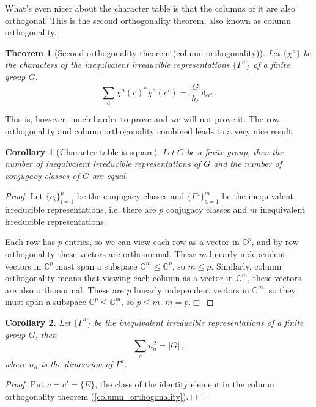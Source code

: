 \documentclass{article}
\theoremstyle{plain}\theoremheaderfont{\normalfont\itshape}\theorembodyfont{\rmfamily}\theoremseparator{.}\newtheorem*{rem}{Remark}\newtheorem*{ex}{Example}\newtheorem*{proof}{Proof}\newtheorem*{altp}{Alternative proof}
\theoremstyle{plain}\theoremheaderfont{\normalfont\bfseries}\theorembodyfont{\rmfamily}\theoremseparator{.}\newtheorem{thm}{Theorem}[section]\newtheorem{lem}[thm]{Lemma}\newtheorem{prop}[thm]{Proposition}\newtheorem*{cor}{Corollary}\newtheorem{defn}[thm]{Definition}\newtheorem{clm}[thm]{Claim}\newtheorem{clminproof}{Claim}\newtheorem*{law}{Law}\newtheorem{pos}[thm]{Postulate}
\theoremstyle{break}\theoremheaderfont{\normalfont\itshape}\theorembodyfont{\rmfamily}\theoremseparator{.\medskip}\newtheorem*{proofskip}{Proof}\newtheorem*{exs}{Examples}\newtheorem*{rems}{Remarks}
\theoremstyle{break}\theoremheaderfont{\normalfont\bfseries}\theorembodyfont{\rmfamily}\theoremseparator{.\medskip}\newtheorem{lemskip}[thm]{Lemma}\newtheorem{defnskip}[thm]{Definition}\newtheorem{propskip}[thm]{Proposition}\newtheorem{thmskip}[thm]{Theorem}
\numberwithin{equation}{section}
\newcommand{\qed}{\hfill\ensuremath{\Box}}
\newcommand{\abs}[1]{\left| #1 \right|}
\newcommand{\CC}{\mathbb{C}}
\begin{document}
    What's even nicer about the character table is that the columns of it are also orthogonal! This is the second orthogonality theorem, also known as column orthogonality.
    \begin{thm}[Second orthogonality theorem (column orthogonality)]
        Let \(\{\chi^a\}\) be the characters of the inequivalent irreducible representations \(\{\Gamma^a\}\) of a finite group \(G\).
        \begin{equation}\label{column_orthogonality}
            \sum_{a}\chi^a(c)^*\chi^a(c')=\frac{\abs{G}}{h_c}\delta_{cc'}\,.
        \end{equation}
    \end{thm}
    This is, however, much harder to prove and we will not prove it. The row orthogonality and column orthogonality combined leads to a very nice result.
    \begin{cor}[Character table is square]
        Let \(G\) be a finite group, then the number of inequivalent irreducible representations of \(G\) and the number of conjugacy classes of \(G\) are equal.
    \end{cor}
    \begin{proof}
        Let \(\{c_i\}_{i=1}^{p}\) be the conjugacy classes and \(\{\Gamma^a\}_{a=1}^{m}\) be the inequivalent irreducible representations, i.e. there are \(p\) conjugacy classes and \(m\) inequivalent irreducible representations.
        
        Each row has \(p\) entries, so we can view each row as a vector in \(\CC^p\), and by row orthogonality these vectors are orthonormal. These \(m\) linearly independent vectors in \(\CC^p\) must span a subspace \(\CC^m\le\CC^p\), so \(m\le p\). Similarly, column orthogonality means that viewing each column as a vector in \(\CC^m\), these vectors are also orthonormal. These are \(p\) linearly independent vectors in \(\CC^m\), so they must span a subspace \(\CC^p\le\CC^m\), so \(p\le m\). \(m=p\).\qed
    \end{proof}
    \begin{cor}
        Let \(\{\Gamma^a\}\) be the inequivalent irreducible representations of a finite group \(G\), then
        \begin{equation}
            \sum_a n_a^2=\abs{G}\,,
        \end{equation}
        where \(n_a\) is the dimension of \(\Gamma^a\).
    \end{cor}
    \begin{proof}
        Put \(c=c'=\{E\}\), the class of the identity element in the column orthogonality theorem (\ref{column_orthogonality}).\qed
    \end{proof}
\end{document}
